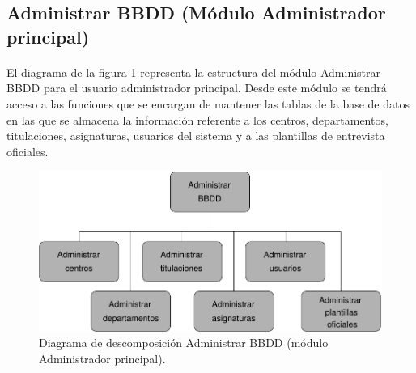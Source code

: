 \subsection{Administrar BBDD (Módulo Administrador principal)}

  \paragraph{}El diagrama de la figura
  \ref{diagramaDescomposicionAdministrarBBDD} representa la estructura del
  módulo Administrar BBDD para el usuario administrador principal. Desde este
  módulo se tendrá acceso a las funciones que se encargan de mantener las tablas
  de la base de datos en las que se almacena la información referente a los
  centros, departamentos, titulaciones, asignaturas, usuarios del sistema y
  a las plantillas de entrevista oficiales.

  \begin{figure}[!ht]
    \begin{center}
      \includegraphics[]{11.Disenyo_Arquitectonico/11.2.Diagramas_Descomposicion/11.2.2.Modulo_administrador_principal/AdministrarBBDD/Diagramas/administrar_bbdd.pdf}
      \caption{Diagrama de descomposición Administrar BBDD (módulo Administrador principal).}
      \label{diagramaDescomposicionAdministrarBBDD}
    \end{center}
  \end{figure}


